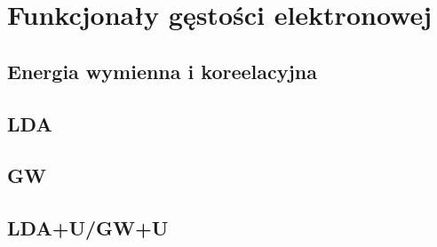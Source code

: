 \section{Funkcjonały gęstości elektronowej}


\subsection{Energia wymienna i koreelacyjna}


\subsection{LDA}


\subsection{GW}


\subsection{LDA+U/GW+U}


